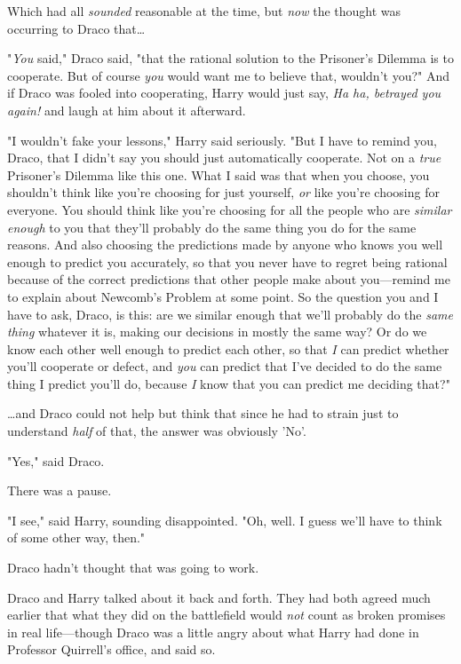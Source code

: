 Which had all \emph{sounded} reasonable at the time, but \emph{now} the thought 
was occurring to Draco that{\ldots}

"\emph{You} said," Draco said, "that the rational solution to the Prisoner's 
Dilemma is to cooperate. But of course \emph{you} would want me to believe 
that, wouldn't you?" And if Draco was fooled into cooperating, Harry would just 
say, \emph{Ha ha, betrayed you again!} and laugh at him about it afterward.

"I wouldn't fake your lessons," Harry said seriously. "But I have to remind 
you, Draco, that I didn't say you should just automatically cooperate. Not on a 
\emph{true} Prisoner's Dilemma like this one. What I said was that when you 
choose, you shouldn't think like you're choosing for just yourself, \emph{or} 
like you're choosing for everyone. You should think like you're choosing for 
all the people who are \emph{similar enough} to you that they'll probably do 
the same thing you do for the same reasons. And also choosing the predictions 
made by anyone who knows you well enough to predict you accurately, so that you 
never have to regret being rational because of the correct predictions that 
other people make about you---remind me to explain about Newcomb's Problem at 
some point. So the question you and I have to ask, Draco, is this: are we 
similar enough that we'll probably do the \emph{same thing} whatever it is, 
making our decisions in mostly the same way? Or do we know each other well 
enough to predict each other, so that \emph{I} can predict whether you'll 
cooperate or defect, and \emph{you} can predict that I've decided to do the 
same thing I predict you'll do, because \emph{I} know that you can predict me 
deciding that?"

{\ldots}and Draco could not help but think that since he had to strain just to 
understand \emph{half} of that, the answer was obviously 'No'.

"Yes," said Draco.

There was a pause.

"I see," said Harry, sounding disappointed. "Oh, well. I guess we'll have to 
think of some other way, then."

Draco hadn't thought that was going to work.

Draco and Harry talked about it back and forth. They had both agreed much 
earlier that what they did on the battlefield would \emph{not} count as broken 
promises in real life---though Draco was a little angry about what Harry had 
done in Professor Quirrell's office, and said so.

